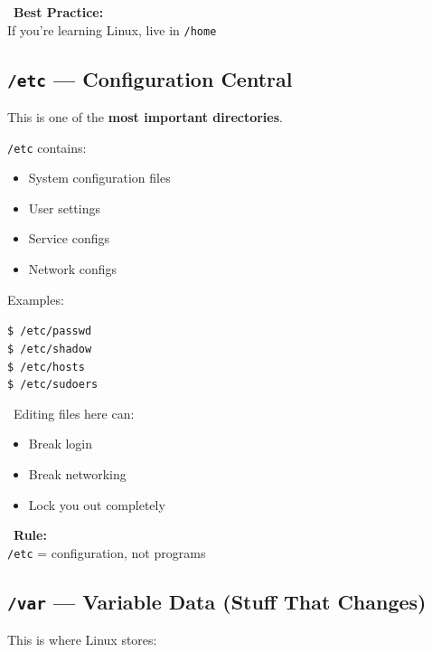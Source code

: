 \documentclass[12pt]{article}
\newcommand{\warningicon}{\faExclamationTriangle}
\newcommand{\handicon}{\faHandPointRight}
\begin{document}
\begin{infobox}
\handicon\ \textbf{Best Practice:}\\
If you're learning Linux, live in \texttt{/home}
\end{infobox}

\subsection*{\texttt{/etc} — Configuration Central}

This is one of the \textbf{most important directories}.

\texttt{/etc} contains:

\begin{itemize}
    \item System configuration files
    \item User settings
    \item Service configs
    \item Network configs
\end{itemize}

Examples:

\begin{highlightbox}
\texttt{\$ /etc/passwd}\\
\texttt{\$ /etc/shadow}\\
\texttt{\$ /etc/hosts}\\
\texttt{\$ /etc/sudoers}
\end{highlightbox}

\begin{warningbox}
\warningicon\ Editing files here can:
\begin{itemize}
    \item Break login
    \item Break networking
    \item Lock you out completely
\end{itemize}
\end{warningbox}

\begin{infobox}
\handicon\ \textbf{Rule:}\\
\texttt{/etc} = configuration, not programs
\end{infobox}

\subsection*{\texttt{/var} — Variable Data (Stuff That Changes)}

This is where Linux stores:
\end{document}
